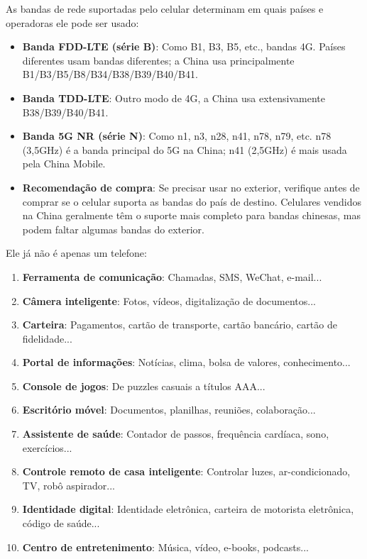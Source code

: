 As bandas de rede suportadas pelo celular determinam em quais países e operadoras ele pode ser usado:

\begin{itemize}
  \item \textbf{Banda FDD-LTE (série B)}: Como B1, B3, B5, etc., bandas 4G. Países diferentes usam bandas diferentes; a China usa principalmente B1/B3/B5/B8/B34/B38/B39/B40/B41.
  \item \textbf{Banda TDD-LTE}: Outro modo de 4G, a China usa extensivamente B38/B39/B40/B41.
  \item \textbf{Banda 5G NR (série N)}: Como n1, n3, n28, n41, n78, n79, etc. n78 (3,5GHz) é a banda principal do 5G na China; n41 (2,5GHz) é mais usada pela China Mobile.
  \item \textbf{Recomendação de compra}: Se precisar usar no exterior, verifique antes de comprar se o celular suporta as bandas do país de destino. Celulares vendidos na China geralmente têm o suporte mais completo para bandas chinesas, mas podem faltar algumas bandas do exterior.
\end{itemize}


Ele já não é apenas um telefone:

\begin{enumerate}
  \item \textbf{Ferramenta de comunicação}: Chamadas, SMS, WeChat, e-mail...
  \item \textbf{Câmera inteligente}: Fotos, vídeos, digitalização de documentos...
  \item \textbf{Carteira}: Pagamentos, cartão de transporte, cartão bancário, cartão de fidelidade...
  \item \textbf{Portal de informações}: Notícias, clima, bolsa de valores, conhecimento...
  \item \textbf{Console de jogos}: De puzzles casuais a títulos AAA...
  \item \textbf{Escritório móvel}: Documentos, planilhas, reuniões, colaboração...
  \item \textbf{Assistente de saúde}: Contador de passos, frequência cardíaca, sono, exercícios...
  \item \textbf{Controle remoto de casa inteligente}: Controlar luzes, ar-condicionado, TV, robô aspirador...
  \item \textbf{Identidade digital}: Identidade eletrônica, carteira de motorista eletrônica, código de saúde...
  \item \textbf{Centro de entretenimento}: Música, vídeo, e-books, podcasts...
\end{enumerate}

